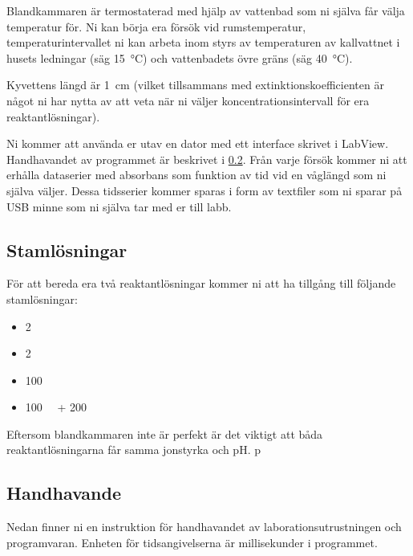 Blandkammaren är termostaterad med hjälp av vattenbad som ni själva får
välja temperatur för. Ni kan börja era försök vid
rumstemperatur, temperaturintervallet ni kan arbeta inom styrs av
temperaturen av kallvattnet i husets ledningar (säg \SI{15}{\celsius})
och vattenbadets övre gräns (säg \SI{40}{\celsius}). 

Kyvettens längd är \SI{1}{\centi\metre} (vilket
tillsammans med extinktionskoefficienten  är något ni har nytta av att
veta när ni väljer koncentrationsintervall för era reaktantlösningar).

Ni kommer att använda er utav en dator med ett interface
skrivet i LabView. Handhavandet av programmet är beskrivet i
\cref{sec:handhavande}. Från varje försök kommer ni att erhålla dataserier med
absorbans som funktion av tid vid en våglängd som ni själva väljer. Dessa
tidsserier kommer sparas i form av textfiler som ni sparar på USB minne
som ni själva tar med er till labb.

\subsection{Stamlösningar}
För att bereda era två reaktantlösningar kommer ni att ha tillgång till följande
stamlösningar:

\begin{itemize}
\item \SI{2}{\Molar} 
\item \SI{2}{\Molar} 
\item \SI{100}{\milli\Molar} 
\item \SI{100}{\milli\Molar}  + \SI{200}{\milli\Molar} 
\end{itemize}

Eftersom blandkammaren inte är perfekt är det viktigt att båda
reaktantlösningarna får samma jonstyrka och pH.
p
\subsection{Handhavande}
\label{sec:handhavande}
Nedan finner ni en instruktion för handhavandet av
laborationsutrustningen och programvaran. Enheten för tidsangivelserna är
millisekunder i programmet.

